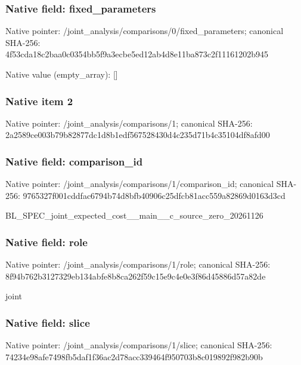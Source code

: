 \documentclass[10pt,a4paper]{article}
\begin{document}
\subsubsection{Native field: fixed\_parameters}


Native pointer: /joint\_analysis/comparis\allowbreak{}ons/0/fixed\_parameters; canonical SHA-256: 4f53cda18c2baa0c0354bb5f\allowbreak{}9a3ecbe5ed12ab4d8e11ba87\allowbreak{}3c2f11161202b945



Native value (empty\_array): []



\subsubsection{Native item 2}


Native pointer: /joint\_analysis/comparisons/1; canonical SHA-256: 2a2589ce003b79b82877dc1d\allowbreak{}8b1edf567528430d4c235d71\allowbreak{}b4c35104df8afd00



\subsubsection{Native field: comparison\_id}


Native pointer: /joint\_analysis/comparis\allowbreak{}ons/1/comparison\_id; canonical SHA-256: 9765327f001cddfac6794b74\allowbreak{}d8bfb40906c25dfcb81acc55\allowbreak{}9a82869d0163d3cd


BL\_SPEC\_joint\_expected\_c\allowbreak{}ost\_\_main\_\_c\_source\_zero\allowbreak{}\_20261126


\subsubsection{Native field: role}


Native pointer: /joint\_analysis/comparisons/1/role; canonical SHA-256: 8f94b762b3127329eb134abf\allowbreak{}e8b8ca262f59c15e9c4e0e3f\allowbreak{}86d45886d57a82de


joint


\subsubsection{Native field: slice}


Native pointer: /joint\_analysis/comparisons/1/slice; canonical SHA-256: 74234e98afe7498fb5daf1f3\allowbreak{}6ac2d78acc339464f950703b\allowbreak{}8c019892f982b90b
\end{document}
